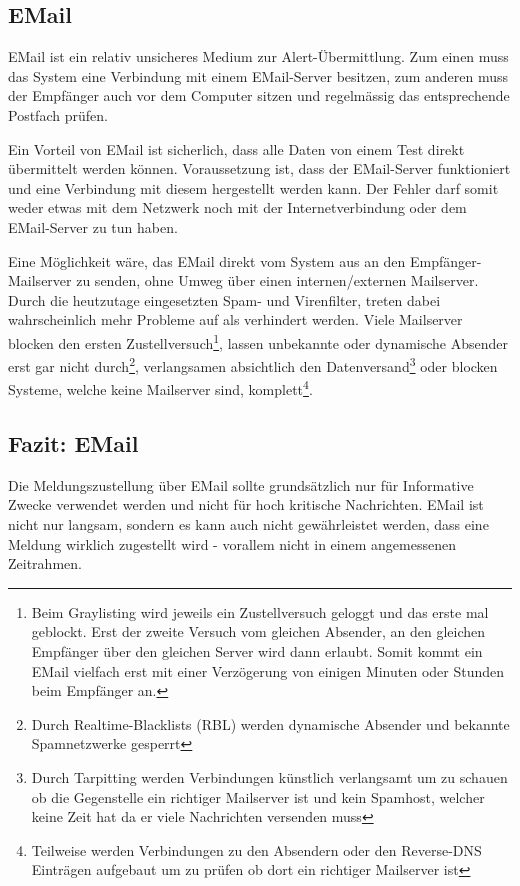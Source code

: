 \subsection{EMail} \label{sec:theorie-alert-email}
EMail ist ein relativ unsicheres Medium zur Alert-\"Ubermittlung. Zum einen muss das System eine Verbindung mit einem EMail-Server besitzen, zum anderen muss der Empf\"anger auch vor dem Computer sitzen und regelm\"assig das entsprechende Postfach pr\"ufen.

Ein Vorteil von EMail ist sicherlich, dass alle Daten von einem Test direkt \"ubermittelt werden k\"onnen. Voraussetzung ist, dass der EMail-Server funktioniert und eine Verbindung mit diesem hergestellt werden kann. Der Fehler darf somit weder etwas mit dem Netzwerk noch mit der Internetverbindung oder dem EMail-Server zu tun haben.

Eine M\"oglichkeit w\"are, das EMail direkt vom System aus an den Empf\"anger-Mailserver zu senden, ohne Umweg \"uber einen internen/externen Mailserver. Durch die heutzutage eingesetzten Spam- und Virenfilter, treten dabei wahrscheinlich mehr Probleme auf als verhindert werden. Viele Mailserver blocken den ersten Zustellversuch\footnote{Beim Graylisting wird jeweils ein Zustellversuch geloggt und das erste mal geblockt. Erst der zweite Versuch vom gleichen Absender, an den gleichen Empf\"anger \"uber den gleichen Server wird dann erlaubt. Somit kommt ein EMail vielfach erst mit einer Verz\"ogerung von einigen Minuten oder Stunden beim Empf\"anger an.}, lassen unbekannte oder dynamische Absender erst gar nicht durch\footnote{Durch Realtime-Blacklists (RBL) werden dynamische Absender und bekannte Spamnetzwerke gesperrt}, verlangsamen absichtlich den Datenversand\footnote{Durch Tarpitting werden Verbindungen k\"unstlich verlangsamt um zu schauen ob die Gegenstelle ein richtiger Mailserver ist und kein Spamhost, welcher keine Zeit hat da er viele Nachrichten versenden muss} oder blocken Systeme, welche keine Mailserver sind, komplett\footnote{Teilweise werden Verbindungen zu den Absendern oder den Reverse-DNS Eintr\"agen aufgebaut um zu pr\"ufen ob dort ein richtiger Mailserver ist}.

\subsection{Fazit: EMail} \label{sec:theorie-alert-email-fazit}
Die Meldungszustellung \"uber EMail sollte grunds\"atzlich nur f\"ur Informative Zwecke verwendet werden und nicht f\"ur hoch kritische Nachrichten. EMail ist nicht nur langsam, sondern es kann auch nicht gew\"ahrleistet werden, dass eine Meldung wirklich zugestellt wird - vorallem nicht in einem angemessenen Zeitrahmen.

